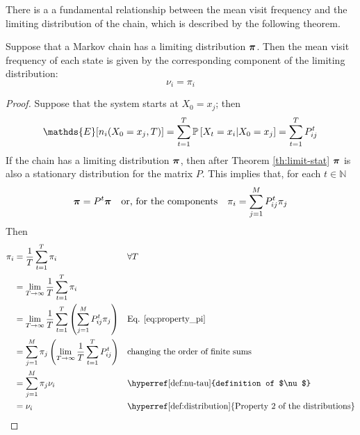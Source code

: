 \medskip
There is a a fundamental relationship between the mean visit frequency and the limiting distribution of the chain, which is described by the following theorem.

\begin{theorem}
    Suppose that a Markov chain has a limiting distribution $\boldsymbol{\pi}$. Then the mean visit frequency of each state is given by the corresponding component of the limiting distribution:
    \begin{equation}
        \nu_i = \pi_i
    \end{equation}
\end{theorem}
\begin{proof}
   Suppose that the system starts at $X_0 = x_j$; then 
    \begin{equation} \label{eq:expected_value}
        \mathds{E} [ n_i (X_0 = x_j, T)] = \sum_{t = 1}^T \prob{X_t = x_i | X_0 = x_j} = \sum_{t = 1}^T P_{ij}^t
    \end{equation} 
    If the chain has a limiting distribution $\boldsymbol{\pi}$, then after Theorem \ref{th:limit-stat} $\boldsymbol{\pi}$ is also a stationary distribution for the matrix $P$. This implies that, for each $t\in \mathbb{N}$
    \begin{equation} \label{eq:property_pi}
        \boldsymbol{\pi} = P^t \boldsymbol{\pi}  \quad \text{or, for the components}\quad \pi_i = \sum_{j = 1}^M P_{ij}^t \pi_{j}
    \end{equation}
    Then
        \begin{align}
            \pi_i 
                &  = \frac{1}{T} \sum_{t = 1}^T \pi_i && \forall T\\
                &  = \lim_{T \rightarrow \infty} \frac{1}{T} \sum_{t = 1}^T \pi_i \\
                & = \lim_{T \rightarrow \infty}  \frac{1}{T} \sum_{t = 1}^T \left(\sum_{j = 1}^M P_{ij}^t \pi_{j}\right) &&  \text{Eq. \ref{eq:property_pi}}\\
                & = \sum_{j = 1}^M \pi_j \left(\lim_{T \rightarrow \infty}  \frac{1}{T}  \sum_{t = 1}^T P_{ij}^t \right) && \text{changing the order of finite sums} \\
                & = \sum_{j = 1}^M \pi_j \nu_i && \text{\hyperref[def:nu-tau]{definition of $\nu$}} \\
                & = \nu_i && \text{\hyperref[def:distribution] {Property 2  of the distributions}}
        \end{align}
\end{proof}